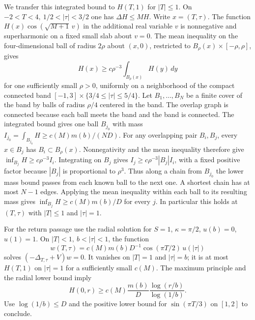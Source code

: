 We transfer this integrated bound to \(H(T,1)\) for \(|T|\le1\).
On \(-2<T<4,\ 1/2<|\tau|<3/2\) one has \(\Delta H\le MH\).
Write \(x=(T,\tau)\). The function
\(H(x)\cos(\sqrt{M+1}\,v)\) in the additional real variable \(v\)
is nonnegative and superharmonic on a fixed small slab about
\(v=0\). The mean inequality on the four-dimensional ball of
radius \(2\rho\) about \((x,0)\), restricted to
\(B_\rho(x)\times[-\rho,\rho]\), gives
\[
 H(x)\ge c\rho^{-3}\int_{B_\rho(x)} H(y)\,dy
\]
for one sufficiently small \(\rho>0\), uniformly on a neighborhood
of the compact connected band
\([-1,3]\times\{3/4\le|\tau|\le5/4\}\).
Let \(B_1,\ldots,B_N\) be a finite cover of the band by balls of
radius \(\rho/4\) centered in the band. The overlap graph is
connected because each ball meets the band and the band is
connected. The integrated bound gives one ball \(B_{j_0}\) with
mass \(I_{j_0}=\int_{B_{j_0}}H\ge c(M)m(b)/(ND)\).
For any overlapping pair \(B_i,B_j\), every \(x\in B_j\) has
\(B_i\subset B_\rho(x)\). Nonnegativity and the mean inequality
therefore give \(\inf_{B_j}H\ge c\rho^{-3}I_i\). Integrating on
\(B_j\) gives \(I_j\ge c\rho^{-3}|B_j|I_i\), with a fixed
positive factor because \(|B_j|\) is proportional to \(\rho^3\).
Thus along a chain from \(B_{j_0}\) the lower mass bound passes
from each known ball to the next one. A shortest chain has at
most \(N-1\) edges. Applying the mean inequality within each
ball to its resulting mass gives \(\inf_{B_j}H\ge c(M)m(b)/D\)
for every \(j\). In particular this holds at \((T,\tau)\) with
\(|T|\le1\) and \(|\tau|=1\).

For the return passage use the radial solution for
\(S=1\), \(\kappa=\pi/2\), \(u(b)=0\), \(u(1)=1\). On
\(|T|<1,\ b<|\tau|<1\), the function
\[
 w(T,\tau)=c(M)m(b)D^{-1}\cos(\pi T/2)\,u(|\tau|)
\]
solves \((-\Delta_{T,\tau}+V)w=0\).
It vanishes on \(|T|=1\) and \(|\tau|=b\); it is at most
\(H(T,1)\) on \(|\tau|=1\) for a sufficiently small \(c(M)\).
The maximum principle and the radial lower bound imply
\[
 H(0,r)\ge c(M)\frac{m(b)}D
              \frac{\log(r/b)}{\log(1/b)}.
\]
Use \(\log(1/b)\le D\) and the positive lower bound for
\(\sin(\pi T/3)\) on \([1,2]\) to conclude.

